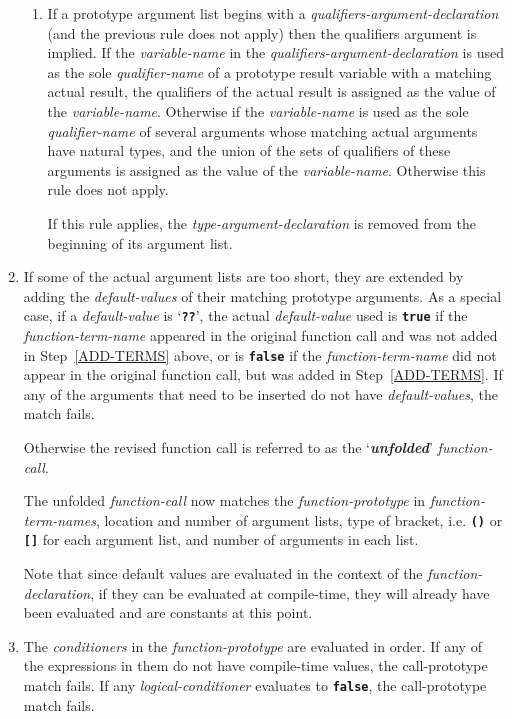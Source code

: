 \documentclass[12pt]{article}
\newcommand{\TT}[1]{{\tt \bfseries #1}}
\newcommand{\mkey}[2]{{\bf \em #1}\index{#1!#2}}
\begin{document}
\begin{enumerate}
\begin{enumerate}
\item
If a prototype argument list begins with a {\em qualifiers-argument-declaration}
(and the previous rule does not apply)
then the qualifiers argument is implied.  If the {\em variable-name}
in the {\em qualifiers-argument-declaration} is used as the sole
{\em qualifier-name} of a prototype result variable with a matching
actual result, the qualifiers of the actual result is assigned as the
value of the {\em variable-name}.  Otherwise if the {\em variable-name}
is used as the sole {\em qualifier-name} of several arguments whose matching
actual arguments have natural types, and the union of the sets of qualifiers
of these arguments is assigned as the
value of the {\em variable-name}.
Otherwise this rule does not apply.

If this rule applies, the {\em type-argument-declaration}
is removed from the beginning of its argument list.

\end{enumerate}

\item
If some of the actual argument lists are too short, they are extended
by adding the {\em default-values} of their matching prototype
arguments.  As a special case, if a {\em default-value} is `\TT{??}',
the actual {\em default-value} used is \TT{true} if the {\em function-term-name}
appeared in the original function call and was not added in
Step~\ref{ADD-TERMS} above, or is \TT{false} if the {\em function-term-name}
did not appear in the original function call, but was added in
Step~\ref{ADD-TERMS}.
If any of the arguments that
need to be inserted do not have {\em default-values}, the match
fails.

Otherwise the revised function call is referred to as the
`\mkey{unfolded}{function call}' {\em function-call}.

The unfolded {\em function-call} now matches
the {\em function-prototype} in {\em function-term-names},
location and number of argument lists, type of bracket, i.e. \TT{()} or
\TT{[]} for each argument list, and number of arguments in each
list.

Note that since default values are evaluated in the context of
the {\em function-declaration}, if they can be evaluated at compile-time,
they will already have been evaluated and are constants at this point.

\item
The {\em conditioners} in the {\em function-prototype} are evaluated
in order.  If any of the expressions in them do not have compile-time
values, the call-prototype match fails.
If any {\em logical-conditioner} evaluates
to \TT{false}, the call-prototype match fails.


\end{enumerate}
\end{document}
